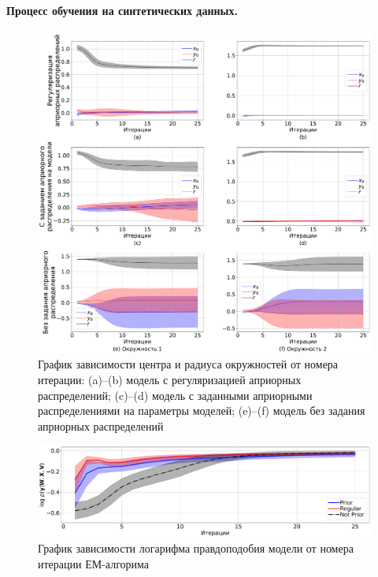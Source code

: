 \documentclass[12pt, twoside]{article}
\numberwithin{equation}{section}
\begin{document}
\paragraph{Процесс обучения на синтетических данных.}
\begin{figure}[h!t]\center
\includegraphics[width=1\textwidth]{result/experiment_synthetic_param_progress}
\caption{График зависимости центра и радиуса окружностей от номера итерации: (a)--(b) модель с регуляризацией априорных распределений; (c)--(d) модель с заданными априорными распределениями на параметры моделей; (e)--(f) модель без задания априорных распределений}
\label{experiment:st:2:1}
\end{figure}

\begin{figure}[h!t]\center
\includegraphics[width=1\textwidth]{result/experiment_synt_likelihood_progress}
\caption{График зависимости логарифма правдоподобия модели от номера итерации ЕМ-алгорима}
\label{experiment:st:2:2}
\end{figure}
\end{document}

